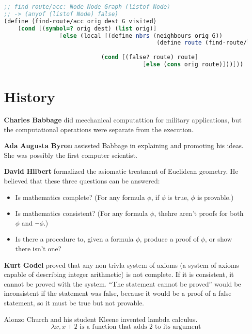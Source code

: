 \documentclass[english, 12pt]{article}
\begin{document}
\begin{lstlisting}[language=Scheme]
;; find-route/acc: Node Node Graph (listof Node)
;; -> (anyof (listof Node) false)
(define (find-route/acc orig dest G visited)
	(cond [(symbol=? orig dest) (list orig)]
				[else (local [(define nbrs (neighbours orig G))
											(define route (find-route/list nbrs dest G
																			(cons orig visited)))]
							(cond [(false? route) route]
										[else (cons orig route)]))]))

\end{lstlisting}
\section{History}
\begin{exmp}
\textbf{Charles Babbage} did meechanical computattion for military applications, but the computational operations were separate from the execution.
\end{exmp}
\begin{exmp}
\textbf{Ada Augusta Byron} assissted Babbage in explaining and promoting his ideas. She was possibly the first computer scientist.
\end{exmp}
\begin{exmp}
\textbf{David Hilbert} formalized the asiomatic treatment of Euclidean geometry. He believed that these three questions can be answered:
\begin{itemize}
	\item Is mathematics complete? (For any formula $\phi$, if $\phi$ is true, $\phi$ is provable.)
	\item Is mathematics consistent? (For any formula $\phi$, thehre aren't proofs for both $\phi$ and $\lnot \phi$.)
	\item Is there a procedure to, given a formula $\phi$, produce a proof of $\phi$, or show there isn't one?
\end{itemize}
\end{exmp}
\begin{exmp}
\textbf{Kurt Godel} proved that any non-trivla system of axioms (a system of axioms capable of describing integer arithmetic) is not complete. If it is consistent, it cannot be proved with the system. ``The statement cannot be proved'' would be inconsistent if the statement was false, because it would be a proof of a false statement, so it must be true but not provable.
\end{exmp}
\begin{exmp}
Alonzo Church and his student Kleene invented lambda calculus.
\[ \lambda x, x + 2\text{ is a function that adds 2 to its argument}\]
\end{exmp}
\end{document}
